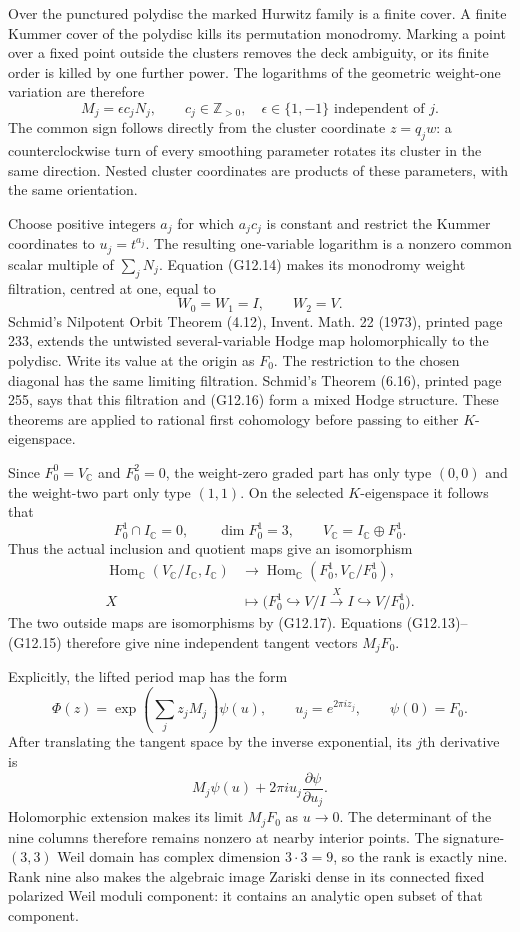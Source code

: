 Over the punctured polydisc the marked Hurwitz family is a finite
cover. A finite Kummer cover of the polydisc kills its permutation
monodromy. Marking a point over a fixed point outside the clusters
removes the deck ambiguity, or its finite order is killed by one
further power. The logarithms of the geometric weight-one variation
are therefore
\[
M_j=\epsilon c_jN_j,\qquad c_j\in\mathbb Z_{>0},
\quad \epsilon\in\{1,-1\}\text{ independent of }j.
\tag{G12.15}
\]
The common sign follows directly from the cluster coordinate
$z=q_jw$: a counterclockwise turn of every smoothing parameter
rotates its cluster in the same direction. Nested cluster coordinates
are products of these parameters, with the same orientation.

Choose positive integers $a_j$ for which $a_jc_j$ is constant and
restrict the Kummer coordinates to $u_j=t^{a_j}$. The resulting
one-variable logarithm is a nonzero common scalar multiple of
$\sum_jN_j$. Equation (G12.14) makes its monodromy weight filtration,
centred at one, equal to
\[
W_0=W_1=I,\qquad W_2=V.
\tag{G12.16}
\]
Schmid's Nilpotent Orbit Theorem (4.12), Invent. Math. 22 (1973),
printed page 233, extends the untwisted several-variable Hodge map
holomorphically to the polydisc. Write its value at the origin as
$F_0$. The restriction to the chosen diagonal has the same limiting
filtration. Schmid's Theorem (6.16), printed page 255, says that
this filtration and (G12.16) form a mixed Hodge structure.
These theorems are applied to rational first cohomology before
passing to either $K$-eigenspace.

Since $F_0^0=V_{\mathbb C}$ and $F_0^2=0$, the weight-zero
graded part has only type $(0,0)$ and the weight-two part only
type $(1,1)$. On the selected $K$-eigenspace it follows that
\[
F_0^1\cap I_{\mathbb C}=0,\qquad
\dim F_0^1=3,\qquad V_{\mathbb C}=I_{\mathbb C}\oplus F_0^1.
\tag{G12.17}
\]
Thus the actual inclusion and quotient maps give an isomorphism
\[
\begin{split}
\operatorname{Hom}_{\mathbb C}(V_{\mathbb C}/I_{\mathbb C},I_{\mathbb C})
&\longrightarrow
\operatorname{Hom}_{\mathbb C}(F_0^1,V_{\mathbb C}/F_0^1),\\
X&\longmapsto
\bigl(F_0^1\hookrightarrow V/I\xrightarrow{X}I
\hookrightarrow V/F_0^1\bigr).
\end{split}
\tag{G12.18}
\]
The two outside maps are isomorphisms by (G12.17).
Equations (G12.13)--(G12.15) therefore give nine independent
tangent vectors $M_jF_0$.

Explicitly, the lifted period map has the form
\[
\Phi(z)=\exp\left(\sum_jz_jM_j\right)\psi(u),
\qquad u_j=e^{2\pi iz_j},\qquad\psi(0)=F_0.
\]
After translating the tangent space by the inverse exponential,
its $j$th derivative is
\[
M_j\psi(u)+2\pi i u_j\frac{\partial\psi}{\partial u_j}.
\]
Holomorphic extension makes its limit $M_jF_0$ as $u\to0$.
The determinant of the nine columns therefore remains nonzero
at nearby interior points. The signature-$(3,3)$ Weil domain has
complex dimension $3\cdot3=9$, so the rank is exactly nine.
Rank nine also makes the algebraic image Zariski dense in its
connected fixed polarized Weil moduli component: it contains an
analytic open subset of that component.

